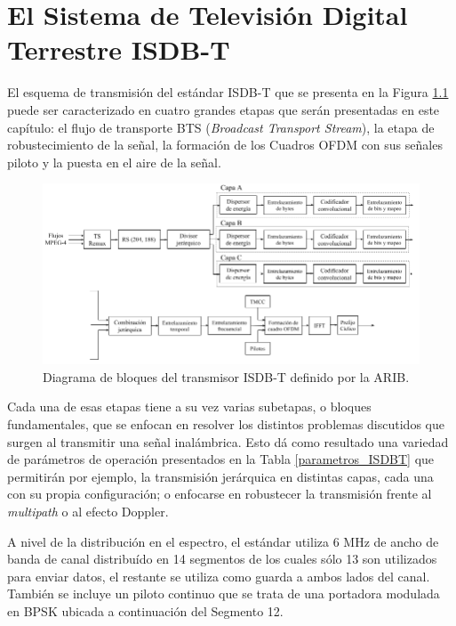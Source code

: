 \chapter{El Sistema de Televisión Digital Terrestre ISDB-T}

El esquema de transmisión del estándar ISDB-T que se presenta en la Figura \ref{f:esquema-tx} puede ser caracterizado en cuatro grandes etapas que serán presentadas en este capítulo: el flujo de transporte BTS (\textit{Broadcast Transport Stream}), la etapa de robustecimiento de la señal, la formación de los Cuadros OFDM con sus señales piloto y la puesta en el aire de la señal.

\begin{figure}[h!]
\centering
\includegraphics[scale=0.46]{figuras/cap03/esquema-tx}
\caption{\label{f:esquema-tx} Diagrama de bloques del transmisor ISDB-T definido por la ARIB.}
\end{figure}



Cada una de esas etapas tiene a su vez varias subetapas, o bloques fundamentales, que se enfocan en resolver los distintos problemas discutidos que surgen al transmitir una señal inalámbrica. Esto dá como resultado una variedad de parámetros de operación presentados en la Tabla \ref{parametros_ISDBT} que permitirán por ejemplo, la transmisión jerárquica en distintas capas, cada una con su propia configuración; o enfocarse en robustecer la transmisión frente al \textit{multipath} o al efecto Doppler.

A nivel de la distribuci\'on en el espectro, el estándar utiliza 6 MHz de ancho de banda de canal distribu\'ido en 14 segmentos de los cuales sólo 13 son utilizados para enviar datos, el restante se utiliza como guarda a ambos lados del canal. Tambi\'en se incluye un piloto continuo que se trata de una portadora modulada en \gls{BPSK} ubicada a continuaci\'on del Segmento 12.

